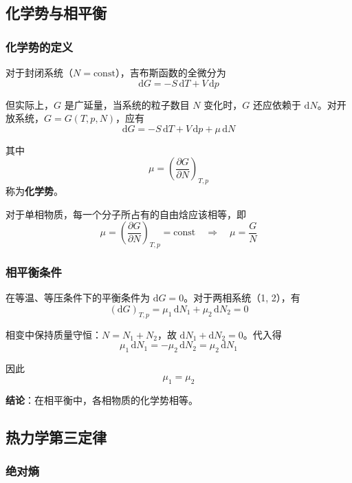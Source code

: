 \documentclass[UTF8]{ctexart}
\begin{document}
\subsection{化学势与相平衡}

\subsubsection{化学势的定义}

对于封闭系统（$N=\text{const}$），吉布斯函数的全微分为
\[
\mathrm{d}G=-S\,\mathrm{d}T+V\,\mathrm{d}p
\]

但实际上，$G$ 是广延量，当系统的粒子数目 $N$ 变化时，$G$ 还应依赖于 $\mathrm{d}N$。对开放系统，$G=G(T,p,N)$，应有
\[
\boxed{\mathrm{d}G=-S\,\mathrm{d}T+V\,\mathrm{d}p+\mu\,\mathrm{d}N}
\]

其中
\[
\boxed{\mu=\left(\frac{\partial G}{\partial N}\right)_{T,p}}
\]
称为\textbf{化学势}。

对于单相物质，每一个分子所占有的自由焓应该相等，即
\[
\mu=\left(\frac{\partial G}{\partial N}\right)_{T,p}=\text{const}
\quad\Longrightarrow\quad
\boxed{\mu=\frac{G}{N}}
\]

\subsubsection{相平衡条件}

在等温、等压条件下的平衡条件为 $\mathrm{d}G=0$。对于两相系统（1, 2），有
\[
(\mathrm{d}G)_{T,p}=\mu_1\,\mathrm{d}N_1+\mu_2\,\mathrm{d}N_2=0
\]

相变中保持质量守恒：$N=N_1+N_2$，故 $\mathrm{d}N_1+\mathrm{d}N_2=0$。代入得
\[
\mu_1\,\mathrm{d}N_1=-\mu_2\,\mathrm{d}N_2=\mu_2\,\mathrm{d}N_1
\]

因此
\[
\boxed{\mu_1=\mu_2}
\]

\textbf{结论}：在相平衡中，各相物质的化学势相等。


\subsection{热力学第三定律}

\subsubsection{绝对熵}
\end{document}
